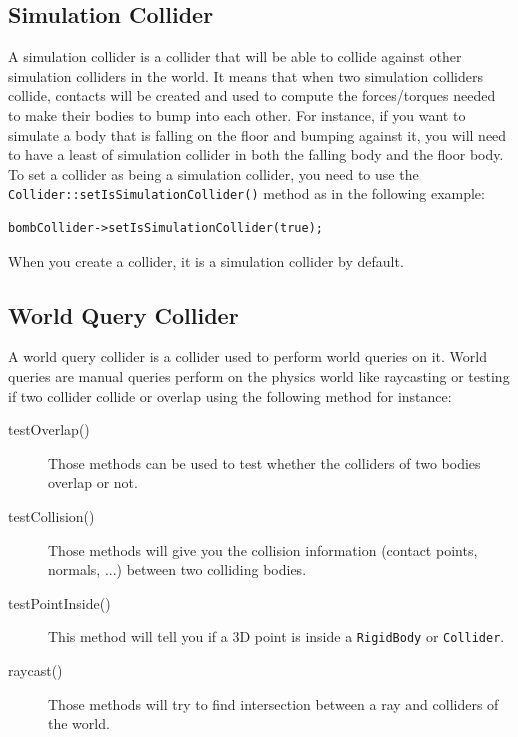 \documentclass[a4paper,12pt]{article}
\begin{document}
    \subsection{Simulation Collider}
    \label{sec:simulationcollider}
    
    A simulation collider is a collider that will be able to collide against other simulation colliders in the world. It means that when two simulation
    colliders collide, contacts will be created and used to compute the forces/torques needed to make their bodies to bump into each other. For instance,
    if you want to simulate a body that is falling on the floor and bumping against it, you will need to have a least of simulation collider in both the
    falling body and the floor body. \\

    To set a collider as being a simulation collider, you need to use the
    \texttt{Collider::\allowbreak setIsSimulationCollider()} method as in the following example: \\

    \begin{lstlisting}
bombCollider->setIsSimulationCollider(true);
   \end{lstlisting}

    \vspace{0.6cm}

    When you create a collider, it is a simulation collider by default.

    \subsection{World Query Collider}
    \label{sec:worldquerycollider}

    A world query collider is a collider used to perform world queries on it. World queries are manual queries perform on the physics world like raycasting
    or testing if two collider collide or overlap using the following method for instance:

    \begin{description}
       \item[testOverlap()] Those methods can be used to test whether the colliders of two bodies overlap or not. 
       \item[testCollision()] Those methods will give you the collision information (contact points, normals, ...) between two colliding bodies.
       \item[testPointInside()] This method will tell you if a 3D point is inside a \texttt{RigidBody} or \texttt{Collider}. 
       \item[raycast()] Those methods will try to find intersection between a ray and colliders of the world.
    \end{description}
\end{document}
